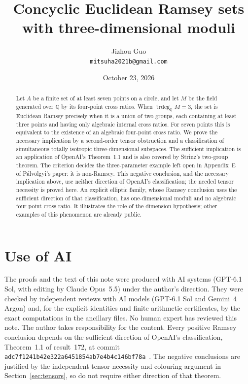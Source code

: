 \documentclass[11pt,a4paper]{article}
\title{Concyclic Euclidean Ramsey sets\protect\\ with three-dimensional moduli}
\author{Jizhou Guo\\\texttt{mitsuha2021b@gmail.com}}
\date{October 23, 2026}
\numberwithin{equation}{section}
\theoremstyle{definition}
\theoremstyle{remark}
\newcommand{\Q}{\mathbb Q}
\newcommand{\trdeg}{\operatorname{trdeg}}
\begin{document}
\maketitle
\begin{abstract}
Let $A$ be a finite set of at least seven points on a circle, and let $M$ be
the field generated over $\Q$ by its four-point cross ratios. When
$\trdeg_\Q M=3$, the set is Euclidean Ramsey precisely when it is a union of
two groups, each containing at least three points and having only algebraic
internal cross ratios. For seven points this is equivalent to the existence
of an algebraic four-point cross ratio. We prove the necessary implication
by a second-order tensor obstruction and a classification of simultaneous
totally isotropic three-dimensional subspaces. The sufficient implication
is an application of OpenAI's Theorem~1.1 and is also covered by Strinz's
two-group theorem. The criterion decides the three-parameter example left
open in Appendix~E of P\'alv\"olgyi's paper: it is non-Ramsey. This negative
conclusion, and the necessary implication above, use neither direction of
OpenAI's classification; the needed tensor necessity is proved here.
An explicit elliptic family, whose Ramsey conclusion uses the sufficient
direction of that classification, has one-dimensional moduli and no
algebraic four-point cross ratio. It illustrates the role of the dimension
hypothesis; other examples of this phenomenon are already public.
\end{abstract}










\begingroup
\raggedright


\endgroup

\section*{Use of AI}
The proofs and the text of this note were produced with AI systems
(GPT-6.1 Sol, with editing by Claude Opus~5.5) under the author's
direction. They were checked by independent reviews with AI models
(GPT-6.1 Sol and Gemini~4 Argon) and, for the explicit identities and
finite arithmetic certificates, by the exact computations in the
ancillary files. No human expert has reviewed this note. The author
takes responsibility for the content. Every positive Ramsey conclusion
depends on the sufficient direction of OpenAI's classification,
Theorem~1.1 of result~172, at commit
\texttt{adc7f1241b42e322a6451854ab7e4b4c146bf78a}~\cite{openai2026}.
The negative conclusions are justified by the independent tensor-necessity
and colouring argument in Section~\ref{sec:tensors}, so do not require
either direction of that theorem.
\end{document}
